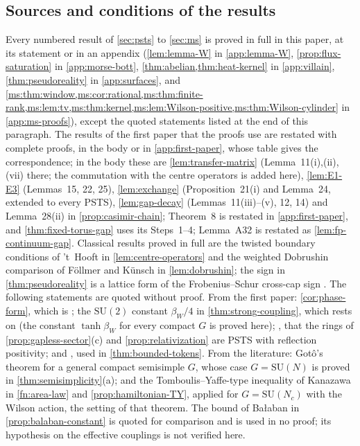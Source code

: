\documentclass[11pt,a4paper]{amsart}
\theoremstyle{definition}
\theoremstyle{remark}
\numberwithin{equation}{section}
\newcommand{\SU}{\mathrm{SU}}              %
\newcommand{\PSTS}{\textup{PSTS}}          %
\newcommand{\betaW}{\beta_{W}}             %
\begin{document}
\subsection{Sources and conditions of the results}
Every numbered result of \cref{sec:psts} to \cref{sec:ms} is proved in full in this paper, at its statement or in an appendix (\cref{lem:lemma-W} in \cref{app:lemma-W}, \cref{prop:flux-saturation} in \cref{app:morse-bott}, \cref{thm:abelian,thm:heat-kernel} in \cref{app:villain}, \cref{thm:pseudoreality} in \cref{app:surfaces}, and \cref{ms:thm:window,ms:cor:rational,ms:thm:finite-rank,ms:lem:tv,ms:thm:kernel,ms:lem:Wilson-positive,ms:thm:Wilson-cylinder} in \cref{app:ms-proofs}), except the quoted statements listed at the end of this paragraph. The results of the first paper \cite{bhattacharjee2026first} that the proofs use are restated with complete proofs, in the body or in \cref{app:first-paper}, whose table gives the correspondence; in the body these are \cref{lem:transfer-matrix} (Lemma~11(i),(ii),(vii) there; the commutation with the centre operators is added here), \cref{lem:E1-E3} (Lemmas~15, 22, 25), \cref{lem:exchange} (Proposition~21(i) and Lemma~24, extended to every \PSTS{}), \cref{lem:gap-decay} (Lemmas~11(iii)--(v), 12, 14) and Lemma~28(ii) in \cref{prop:casimir-chain}; Theorem~8 is restated in \cref{app:first-paper}, and \cref{thm:fixed-torus-gap} uses its Steps~1--4; Lemma~A32 is restated as \cref{lem:fp-continuum-gap}. Classical results proved in full are the twisted boundary conditions of 't~Hooft \cite{thooft1979} in \cref{lem:centre-operators} and the weighted Dobrushin comparison of F\"ollmer \cite{follmer1982} and K\"unsch \cite{kunsch1982} in \cref{lem:dobrushin}; the sign in \cref{thm:pseudoreality} is a lattice form of the Frobenius--Schur cross-cap sign \cite{witten1991,drouffe1983}. The following statements are quoted without proof. From the first paper: \cref{cor:phase-form}, which is \cite[Theorem~F(iii)]{bhattacharjee2026first}; the $\SU(2)$ constant $\betaW/4$ in \cref{thm:strong-coupling}, which rests on \cite[Theorem~A1]{bhattacharjee2026first} (the constant $\tanh\betaW$ for every compact $G$ is proved here); \cite[Proposition~17]{bhattacharjee2026first}, that the rings of \cref{prop:gapless-sector}(c) and \cref{prop:relativization} are \PSTS{} with reflection positivity; and \cite[Lemma~13(ii)]{bhattacharjee2026first}, used in \cref{thm:bounded-tokens}. From the literature: Got\^o's theorem \cite{goto1949} for a general compact semisimple $G$, whose case $G=\SU(N)$ is proved in \cref{thm:semisimplicity}(a); and the Tomboulis--Yaffe-type inequality of Kanazawa \cite{kanazawa2009} in \cref{fn:area-law} and \cref{prop:hamiltonian-TY}, applied for $G=\SU(N_c)$ with the Wilson action, the setting of that theorem. The bound of Ba{\l}aban \cite{balaban1989b} in \cref{prop:balaban-constant} is quoted for comparison and is used in no proof; its hypothesis on the effective couplings is not verified here.
\end{document}
